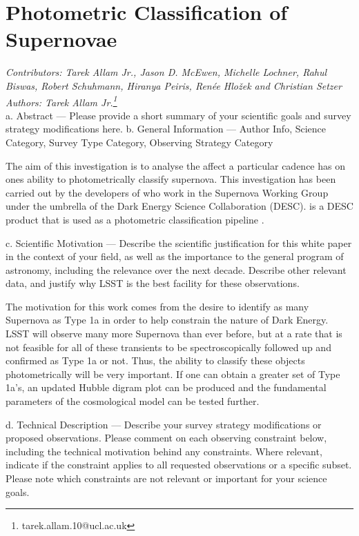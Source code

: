 \usepackage{graphicx}
\usepackage{subcaption}
\usepackage{float}

\section{Photometric Classification of Supernovae}
\textit{Contributors: Tarek Allam Jr., Jason D. McEwen, Michelle Lochner, Rahul
Biswas, Robert Schuhmann, Hiranya Peiris, Ren\'ee Hlo\v{z}ek and Christian Setzer} \\
\textit{Authors: Tarek Allam Jr.\footnote{tarek.allam.10@ucl.ac.uk}} \\

a. Abstract — Please provide a short summary of your scientific goals and survey
strategy modifications here.
b. General Information — Author Info, Science Category, Survey Type Category,
Observing Strategy Category

The aim of this investigation is to analyse the affect a particular cadence has
on ones ability to photometrically classify supernova. This investigation has been carried out by the
developers of  who work in the Supernova Working Group under the umbrella of the Dark Energy Science
Collaboration (DESC).  is a DESC product that is used as a photometric
classification pipeline \cite{lochner2016photometric}.

c. Scientific Motivation — Describe the scientific justification for this white
paper in the context of your field, as well as the importance to the general
program of astronomy, including the relevance over the next decade. Describe
other relevant data, and justify why LSST is the best facility for these
observations.

The motivation for this work comes from the desire to identify as many Supernova
as Type 1a in order to help constrain the nature of Dark Energy.
LSST will observe many more Supernova than ever before, but at a rate that is
not feasible for all of these transients to be spectroscopically followed up and
confirmed as Type 1a or not.
Thus, the ability to classify these objects photometrically will be very
important. If one can obtain a greater set of Type 1a's, an updated Hubble
digram plot can be produced and the fundamental parameters of the cosmological
model can be tested further.

d. Technical Description — Describe your survey strategy modifications or
proposed observations. Please comment on each observing constraint below,
including the technical motivation behind any constraints. Where relevant,
indicate if the constraint applies to all requested observations or a specific
subset. Please note which constraints are not relevant or important for your
science goals.

